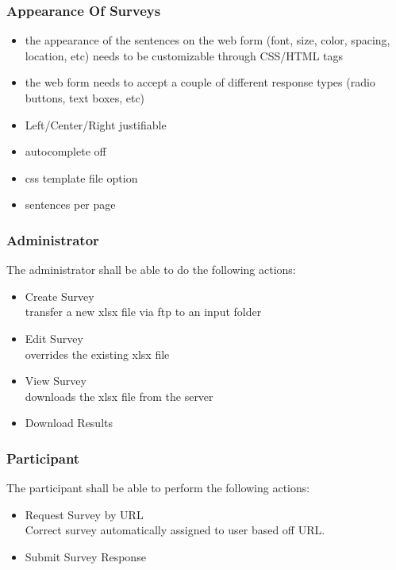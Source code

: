 \documentclass[a4paper,12pt,oneside]{report}
\begin{document}
\subsubsection { Appearance Of Surveys}

\begin{itemize} 
	\item  the appearance of the sentences on the web form (font, size, color, spacing, location, etc) needs to be customizable through CSS/HTML tags
	\item the web form needs to accept a couple of different response types (radio buttons, text boxes, etc)
	\item Left/Center/Right justifiable
	\item autocomplete off
	\item css template file option
	\item sentences per page
\end{itemize}
\subsubsection{Administrator}
The administrator shall be able to do the following actions:
\begin{itemize}
	\item Create Survey \\ transfer a new xlsx file via ftp to an input folder
	\item Edit Survey \\ overrides the existing xlsx file
	\item View Survey \\ downloads the xlsx file from the server
	\item Download Results 
\end{itemize}

\subsubsection{Participant}
The participant shall be able to perform the following actions:
\begin{itemize}
	\item Request Survey by URL \\ Correct survey automatically assigned to user based off URL.
	\item Submit Survey Response
\end{itemize}
\end{document}
